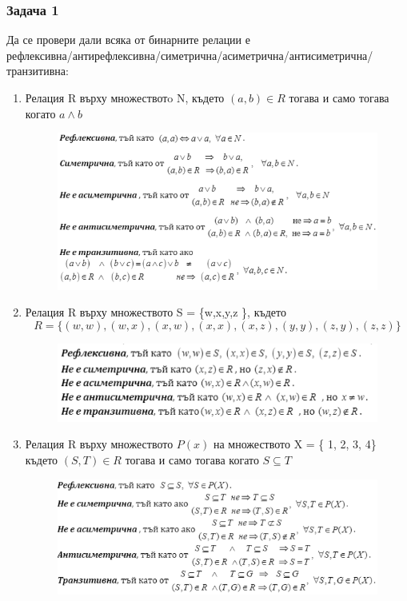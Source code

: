 \documentclass[fleqn, 12pt]{article}
\theoremstyle{definition}
\begin{document}
\subsubsection*{Задача 1}
Да се провери дали всяка от бинарните релации е\\
рефлексивна/антирефлексивна/симетрична/асиметрична/антисиметрична/транзитивна:
\begin{enumerate}
\item Релация R върху множествотo N, където $(a,b) \in R $ тогава и само тогава когато $a \land b$
\begin{figure} [htp!]
\includegraphics[width=\linewidth]{Pics/Discrete math/ex6/ex6-task1-1.png}
\end{figure}
\item Релация R върху множеството S = \{w,x,y,z \}, където 
$$R = \{ (w, w), (w, x), (x, w), (x, x), (x, z), (y, y), (z, y), (z, z) \}$$
\begin{figure} [htp!]
\includegraphics[width=\linewidth]{Pics/Discrete math/ex6/ex6-task1-2.png}
\end{figure}
\item Релация R върху множеството $P(x)$ на  множеството X = \{ 1, 2, 3, 4\} където $(S,T) \in R$ тогава и само тогава когато $S \subseteq T$
\begin{figure} [htp!]
\includegraphics[width=\linewidth]{Pics/Discrete math/ex6/ex6-task1-3.png}
\end{figure}
\end{enumerate}
\end{document}
